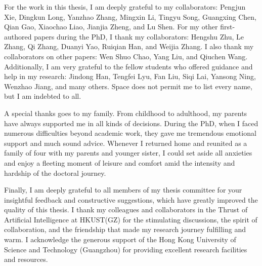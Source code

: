 For the work in this thesis, I am deeply grateful to my collaborators: Pengjun Xie, Dingkun Long, Yanzhao Zhang, Mingxin Li, Tingyu Song, Guangxing Chen, Qian Gao, Xiaochao Liao, Jianjia Zheng, and Lu Shen. For my other first-authored papers during the PhD, I thank my collaborators: Hengshu Zhu, Le Zhang, Qi Zhang, Duanyi Yao, Ruiqian Han, and Weijia Zhang. I also thank my collaborators on other papers: Wen Shuo Chao, Yang Liu, and Qiuchen Wang. Additionally, I am very grateful to the fellow students who offered guidance and help in my research: Jindong Han, Tengfei Lyu, Fan Liu, Siqi Lai, Yansong Ning, Wenzhao Jiang, and many others. Space does not permit me to list every name, but I am indebted to all.

A special thanks goes to my family. From childhood to adulthood, my parents have always supported me in all kinds of decisions. During the PhD, when I faced numerous difficulties beyond academic work, they gave me tremendous emotional support and much sound advice. Whenever I returned home and reunited as a family of four with my parents and younger sister, I could set aside all anxieties and enjoy a fleeting moment of leisure and comfort amid the intensity and hardship of the doctoral journey.

Finally, I am deeply grateful to all members of my thesis committee for your insightful feedback and constructive suggestions, which have greatly improved the quality of this thesis. I thank my colleagues and collaborators in the Thrust of Artificial Intelligence at HKUST(GZ) for the stimulating discussions, the spirit of collaboration, and the friendship that made my research journey fulfilling and warm. I acknowledge the generous support of the Hong Kong University of Science and Technology (Guangzhou) for providing excellent research facilities and resources.
